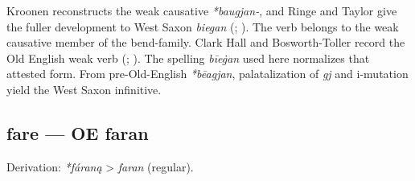 \documentclass[
  british,
  a4paper,
]{article}
\begin{document}
Kroonen reconstructs the weak causative \emph{*baugjan-}, and Ringe and
Taylor give the fuller development to West Saxon \emph{biegan}
(;
). The verb
belongs to the weak causative member of the bend-family. Clark Hall and
Bosworth-Toller record the Old English weak verb
(;
). The
spelling \emph{bīeġan} used here normalizes that attested form. From
pre-Old-English \emph{*bēagjan}, palatalization of \emph{gj} and
i-mutation yield the West Saxon infinitive.

\subsection{fare --- OE faran}\label{fare-oe-faran}

Derivation: \emph{*fáraną} \textgreater{} \emph{faran} (regular).

\begingroup
\setlength{\fboxsep}{6pt}
\end{document}
